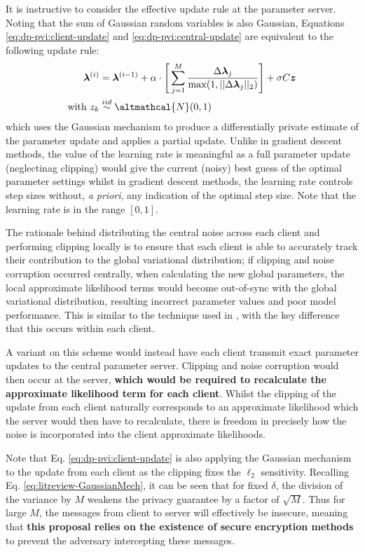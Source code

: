 It is instructive to consider the effective update rule at the parameter server. Noting that the sum of Gaussian random variables is also Gaussian, Equations \eqref{eq:dp-pvi:client-update} and \eqref{eq:dp-pvi:central-update} are equivalent to the following update rule:
\begin{align}
	\bm{\lambda}^{(i)} &= \bm{\lambda}^{(i-1)}  + \alpha \cdot \Bigg[ \sum_{j=1}^M \frac{\Delta \bm{\lambda}_j }{\max (1, || \Delta \bm{\lambda}_j||_2 )} \Bigg]+ \sigma C \bm{z} \nonumber \\
	\text{with } z_k &\stackrel{iid}{\sim} \altmathcal{N}(0, 1)
	 \label{eq:equiv-update}
\end{align}
which uses the Gaussian mechanism to produce a differentially private estimate of the parameter update and applies a partial update. Unlike in gradient descent methods, the value of the learning rate is meaningful as a full parameter update (neglectinag clipping) would give the current (noisy) best guess of the optimal parameter settings whilst in gradient descent methods, the learning rate controls step sizes without, \emph{a priori}, any indication of the optimal step size. Note that the learning rate is in the range $[0, 1]$. 

The rationale behind distributing the central noise across each client and performing clipping locally is to ensure that each client is able to accurately track their contribution to the global variational distribution; if clipping and noise corruption occurred centrally, when calculating the new global parameters, the local approximate likelihood terms would become out-of-sync with the global variational distribution, resulting incorrect parameter values and poor model performance. This is similar to the technique used in \citep{geyer2017differentially}, with the key difference that this occurs within each client.

A variant on this scheme would instead have each client transmit exact parameter updates to the central parameter server. Clipping and noise corruption would then occur at the server, \textbf{which would be required to recalculate the approximate likelihood term for each client}. Whilst the clipping of the update from each client naturally corresponds to an approximate likelihood which the server would then have to recalculate, there is freedom in precisely how the noise is incorporated into the client approximate likelihoods. 

Note that Eq. \eqref{eq:dp-pvi:client-update} is also applying the Gaussian mechanism to the update from each client as the clipping fixes the $\ell_2$ sensitivity. Recalling Eq. \eqref{eq:litreview-GaussianMech}, it can be seen that for fixed $\delta$, the division of the variance by $M$ weakens the privacy guarantee by a factor of $\sqrt{M}$. Thus for large $M$, the messages from client to server will effectively be insecure, meaning that \textbf{this proposal relies on the existence of secure encryption methods} to prevent the adversary intercepting these messages. 

